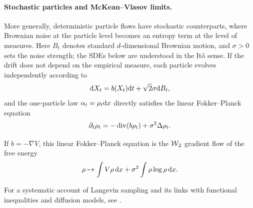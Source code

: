 \paragraph{Stochastic particles and McKean--Vlasov limits.}
More generally, deterministic particle flows have stochastic counterparts, where Brownian noise at the particle level becomes an entropy term at the level of measures. Here $B_t$ denotes standard $d$-dimensional Brownian motion, and $\sigma>0$ sets the noise strength; the SDEs below are understood in the It\^o sense. If the drift does not depend on the empirical measure, each particle evolves independently according to
\[
	\mathrm{d} X_t=b(X_t)\mathrm{d} t+\sqrt{2}\sigma\mathrm{d} B_t,
\]
and the one-particle law $\alpha_t=\rho_t\mathrm{d} x$ directly satisfies the linear Fokker--Planck equation
\[
	\partial_t\rho_t=-\operatorname{div}(b\rho_t)+\sigma^2\Delta\rho_t.
\]

\begin{example}
	If $b=-\nabla V$, this linear Fokker--Planck equation is the $\operatorname{\mathcal{W}}_2$ gradient flow of the free energy
	\[
		\rho\mapsto \int V\rho\,\mathrm{d} x+\sigma^2\int\rho\log\rho\,\mathrm{d} x.
	\]
\end{example}

For a systematic account of Langevin sampling and its links with functional inequalities and diffusion models, see \citet{Chewi2026LogConcaveSampling}.

